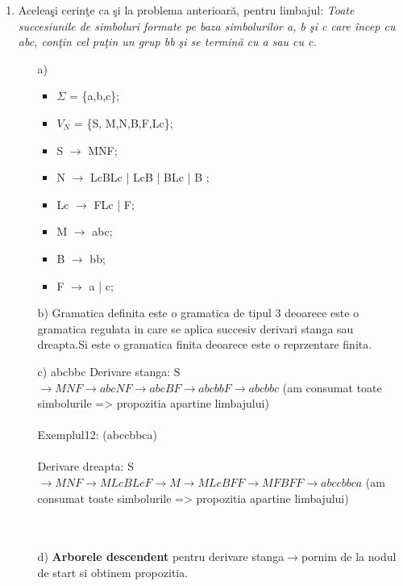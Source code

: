 \begin{enumerate}
\begin{enumerate}
\end{enumerate}

\item
Aceleaşi cerinţe ca şi la problema anterioară, pentru limbajul: \textit{Toate succesiunile de simboluri formate pe baza simbolurilor a, b şi c care încep cu abc, conţin cel puţin un grup bb şi se termină cu a sau cu c.}

\begin{enumerate}
\item[a)]
\begin{itemize}
\item
$\Sigma$ = \{a,b,c\};
\item
$V_{N}$ = \{S, M,N,B,F,Lc\};
\item
S $\rightarrow$ MNF;
\item
N $\rightarrow$ LcBLc |  LcB | BLc | B ;
\item
Lc $\rightarrow$ FLc | F;
\item
M $\rightarrow$ abc;
\item
B $\rightarrow$ bb;
\item
F $\rightarrow$ a | c;
\end{itemize}

\item[b)]
Gramatica definita este o gramatica de tipul 3 deoarece este o gramatica regulata in care se aplica succesiv derivari stanga sau dreapta.Si este o gramatica finita deoarece este o reprzentare finita.

\item[c)]
abcbbc
Derivare stanga:
S$\rightarrow  MNF  \rightarrow abcNF  \rightarrow abcBF \rightarrow abcbbF  \rightarrow abcbbc$ (am consumat toate simbolurile => propozitia apartine limbajului)\\\\
Exemplul12: (abccbbca)\\\\
Derivare dreapta:
S$\rightarrow  MNF  \rightarrow MLcBLcF  \rightarrow M \rightarrow MLcBFF  \rightarrow MFBFF  \rightarrow abccbbca$ (am consumat toate simbolurile => propozitia apartine limbajului)\\\\\\

\item[d)]
\textbf{Arborele descendent} pentru derivare stanga$\rightarrow$pornim de la nodul de start si obtinem propozitia.\\\\


\end{enumerate}
\end{enumerate}
